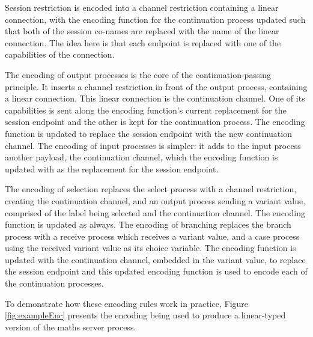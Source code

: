 \documentclass{l4proj}
\begin{document}
\quad Session restriction is encoded into a channel restriction containing a linear connection, with the encoding function for the continuation process updated such that both of the session co-names are replaced with the name of the linear connection. The idea here is that each endpoint is replaced with one of the capabilities of the connection. 

\quad The encoding of output processes is the core of the continuation-passing principle. It inserts a channel restriction in front of the output process, containing a linear connection. This linear connection is the continuation channel. One of its capabilities is sent along the encoding function's current replacement for the session endpoint and the other is kept for the continuation process. The encoding function is updated to replace the session endpoint with the new continuation channel. The encoding of input processes is simpler: it adds to the input process another payload, the continuation channel, which the encoding function is updated with as the replacement for the session endpoint.

\quad The encoding of selection replaces the select process with a channel restriction, creating the continuation channel, and an output process sending a variant value, comprised of the label being selected and the continuation channel. The encoding function is updated as always. The encoding of branching replaces the branch process with a receive process which receives a variant value, and a case process using the received variant value as its choice variable. The encoding function is updated with the continuation channel, embedded in the variant value, to replace the session endpoint and this updated encoding function is used to encode each of the continuation processes.

\quad To demonstrate how these encoding rules work in practice, Figure \ref{fig:exampleEnc} presents the encoding being used to produce a linear-typed version of the maths server process.
\end{document}
